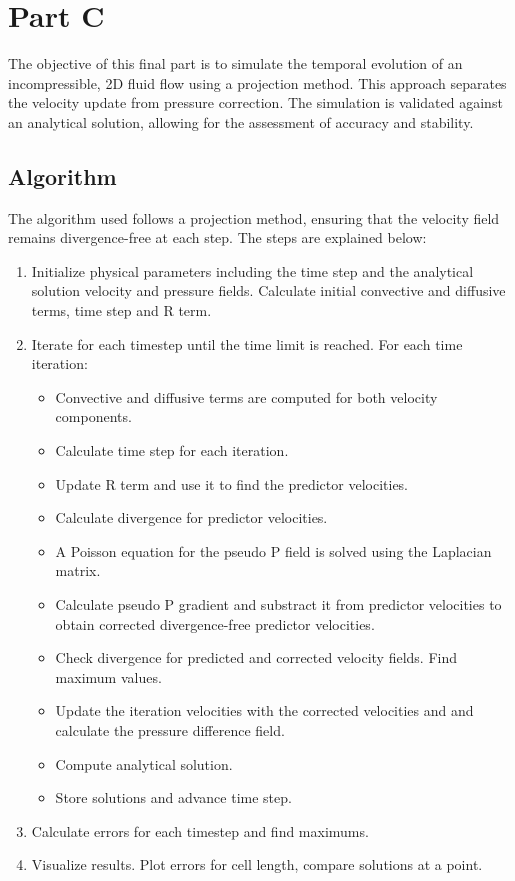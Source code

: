 \section{Part C}

The objective of this final part is to simulate the temporal evolution of an incompressible, 2D fluid flow using a projection method. This approach separates the velocity update from pressure correction. The simulation is validated against an analytical solution, allowing for the assessment of accuracy and stability.

\subsection{Algorithm}

The algorithm used follows a projection method, ensuring that the velocity field remains divergence-free at each step. The steps are explained below:

\begin{enumerate}
    \item Initialize physical parameters including the time step and the analytical solution velocity and pressure fields. Calculate initial convective and diffusive terms, time step and R term.
    
    \item Iterate for each timestep until the time limit is reached. For each time iteration:
    \begin{itemize}
        \item Convective and diffusive terms are computed for both velocity components.
        \item Calculate time step for each iteration.
        \item Update R term and use it to find the predictor velocities.
        \item Calculate divergence for predictor velocities.
        \item A Poisson equation for the pseudo P field is solved using the Laplacian matrix.
        \item Calculate pseudo P gradient and substract it from predictor velocities to obtain corrected divergence-free predictor velocities.
        \item Check divergence for predicted and corrected velocity fields. Find maximum values.
        \item Update the iteration velocities with the corrected velocities and and calculate the pressure difference field.
        \item Compute analytical solution.
        \item Store solutions and advance time step.
    \end{itemize}
    \item Calculate errors for each timestep and find maximums.
    \item Visualize results. Plot errors for cell length, compare solutions at a point.
\end{enumerate}


